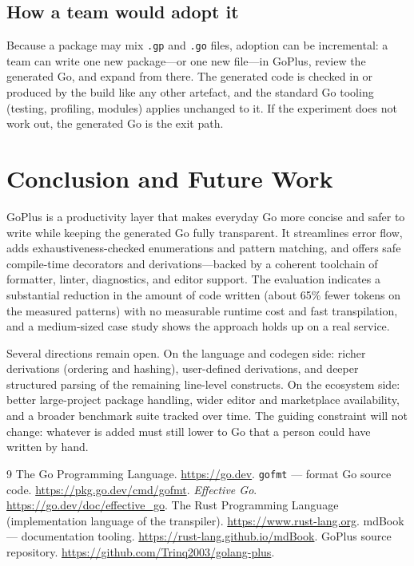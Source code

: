 \documentclass[11pt,a4paper]{article}
\begin{document}
\subsection{How a team would adopt it}
Because a package may mix \texttt{.gp} and \texttt{.go} files, adoption can be
incremental: a team can write one new package---or one new file---in GoPlus,
review the generated Go, and expand from there. The generated code is checked in
or produced by the build like any other artefact, and the standard Go tooling
(testing, profiling, modules) applies unchanged to it. If the experiment does not
work out, the generated Go is the exit path.

\section{Conclusion and Future Work}
GoPlus is a productivity layer that makes everyday Go more concise and safer to
write while keeping the generated Go fully transparent. It streamlines error
flow, adds exhaustiveness-checked enumerations and pattern matching, and offers
safe compile-time decorators and derivations---backed by a coherent toolchain of
formatter, linter, diagnostics, and editor support. The evaluation indicates a
substantial reduction in the amount of code written (about 65\% fewer tokens on
the measured patterns) with no measurable runtime cost and fast transpilation,
and a medium-sized case study shows the approach holds up on a real service.

Several directions remain open. On the language and codegen side: richer
derivations (ordering and hashing), user-defined derivations, and deeper
structured parsing of the remaining line-level constructs. On the ecosystem side:
better large-project package handling, wider editor and marketplace availability,
and a broader benchmark suite tracked over time. The guiding constraint will not
change: whatever is added must still lower to Go that a person could have written
by hand.

\begin{thebibliography}{9}
 The Go Programming Language. \url{https://go.dev}.
 \texttt{gofmt} --- format Go source code. \url{https://pkg.go.dev/cmd/gofmt}.
 \emph{Effective Go}. \url{https://go.dev/doc/effective_go}.
 The Rust Programming Language (implementation language of the transpiler). \url{https://www.rust-lang.org}.
 mdBook --- documentation tooling. \url{https://rust-lang.github.io/mdBook}.
 GoPlus source repository. \url{https://github.com/Trinq2003/golang-plus}.
\end{thebibliography}
\end{document}
